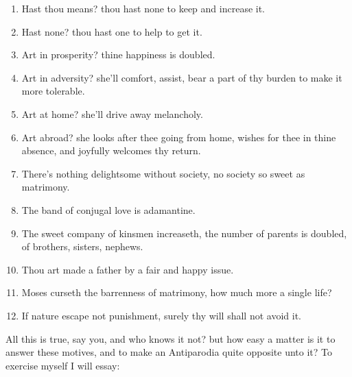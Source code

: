 \begin{displayquote}%
\begin{enumerate}
  \item Hast thou means? thou hast none to keep and increase it.
  \item Hast none? thou hast one to help to get it.
  \item Art in prosperity? thine happiness is doubled.
  \item Art in adversity? she'll comfort, assist, bear a part of thy burden to make it more tolerable.
  \item Art at home? she'll drive away melancholy.
  \item Art abroad? she looks after thee going from home, wishes for thee in thine absence, and joyfully welcomes thy return.
  \item There's nothing delightsome without society, no society so sweet as matrimony.
  \item The band of conjugal love is adamantine.
  \item The sweet company of kinsmen increaseth, the number of parents is doubled, of brothers, sisters, nephews.
  \item Thou art made a father by a fair and happy issue.
  \item Moses curseth the barrenness of matrimony, how much more a single life?
  \item If nature escape not punishment, surely thy will shall not avoid it.
\end{enumerate}
\end{displayquote}

All this is true, say you, and who knows it not? but how easy a matter
is it to answer these motives, and to make an Antiparodia quite
opposite unto it? To exercise myself I will essay:

